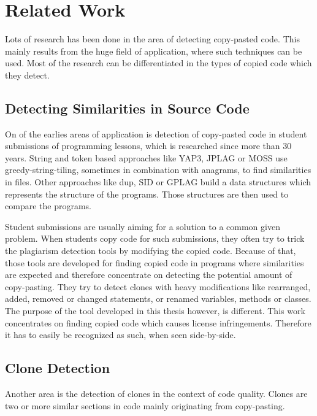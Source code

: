 
\chapter{Related Work}\label{chapter:related_work}
Lots of research has been done in the area of detecting copy-pasted code.
This mainly results from the huge field of application, where such techniques can be used.
Most of the research can be differentiated in the types of copied code which they detect.

\section{Detecting Similarities in Source Code}\label{section:related_work/detecting_similarities}
On of the earlies areas of application is detection of copy-pasted code in student submissions of programming lessons, which is researched since more than 30 years\cite{lancaster2004comparison}.
String and token based approaches like YAP3\cite{wise1996yap3}, JPLAG\cite{prechelt2002finding} or MOSS\cite{schleimer2003winnowing} use greedy-string-tiling, sometimes in combination with anagrams, to find similarities in files.
Other approaches like dup\cite{baker1995finding}, SID\cite{chen2004shared} or GPLAG\cite{liu2006gplag} build a data structures which represents the structure of the programs.
Those structures are then used to compare the programs.

Student submissions are usually aiming for a solution to a common given problem.
When students copy code for such submissions, they often try to trick the plagiarism detection tools by modifying the copied code.
Because of that, those tools are developed for finding copied code in programs where similarities are expected and therefore concentrate on detecting the potential amount of copy-pasting.
They try to detect clones with heavy modifications like rearranged, added, removed or changed statements, or renamed variables, methods or classes.
The purpose of the tool developed in this thesis however, is different.
This work concentrates on finding copied code which causes license infringements.
Therefore it has to easily be recognized as such, when seen side-by-side.

\section{Clone Detection}\label{section:related_work/clone_detection}
Another area is the detection of clones in the context of code quality.
Clones are two or more similar sections in code mainly originating from copy-pasting.

